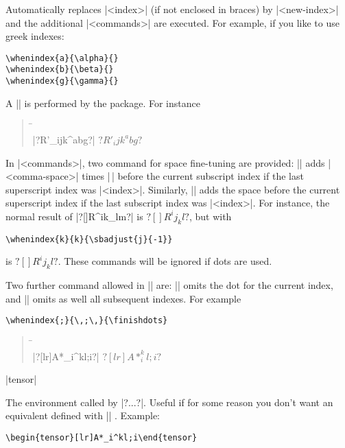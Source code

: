 \documentclass{ltxguide}
\newenvironment{sample}{\begin{quote}\small\begin{tabbing}%
  \hskip12pc\=\hskip6pc\\}
  {\end{tabbing}\end{quote}}
\begin{document}
Automatically replaces |<index>| (if not enclosed in braces)
by |<new-index>| and the additional |<commands>| are
executed. For example, if you like to use greek indexes:
\begin{verbatim}
\whenindex{a}{\alpha}{}
\whenindex{b}{\beta}{}
\whenindex{g}{\gamma}{}
\end{verbatim}

A || is performed by the package. For instance
\begin{sample}
|?R'_ijk^abg?|    \>  $?R'_ijk^abg?$
\end{sample}

In |<commands>|, two command for space fine-tuning are provided:
|| adds |<comma-space>| times
|\,| before the current subscript index if the last superscript index
was |<index>|. Similarly, |\spadjust| adds the space before the current
superscript index if the last subscript index was |<index>|.
For instance, the normal result of |?[]R^ik_lm?| is $?[]R^ij_kl?$, but
with
\begin{verbatim}
\whenindex{k}{k}{\sbadjust{j}{-1}}
\end{verbatim}
is $?[]R^ij_kl?$.
These commands will be ignored if dots are used.

Two further command allowed in |\whenindex|
are: |\omitdot| omits the dot for the current
index, and |\finishdots| omits as well all subsequent indexes.
For example
\begin{verbatim}
\whenindex{;}{\,;\,}{\finishdots}
\end{verbatim}
\whenindex{;}{\,;\,}{\finishdots}

\begin{sample}
|?[lr]A*_i^kl;i?|  \>   $?[lr]A*_i^kl;i?$
\end{sample}

\begin{decl}
|tensor|
\end{decl}

The environment called by |?...?|. Useful if for some reason you
don't want an equivalent defined with |\tensordelimiter| . Example:
\begin{verbatim}
\begin{tensor}[lr]A*_i^kl;i\end{tensor}
\end{verbatim}
\end{document}
